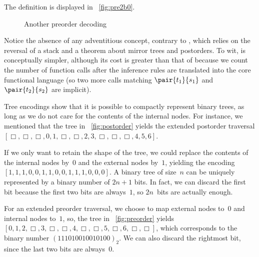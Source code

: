 The definition is displayed in
\fig~\vref{fig:pre2b0}.
\begin{figure}[b]
\abovedisplayskip=0pt
\belowdisplayskip=0pt
\centering
{}
\caption{Another preorder decoding}
\label{fig:pre2b0}
\end{figure}
Notice the absence of any adventitious concept, contrary to
, which relies on the
reversal of a stack and a theorem about mirror
trees and postorders. To wit,
 is conceptually
simpler, although its cost is greater than that of
 because we count the number
of function calls after the inference rules
are translated into the core functional language (so two more calls
matching \(\pair{t_1}{s_1}\) and \(\pair{t_2}{s_2}\) are implicit).

Tree encodings show that it is possible to compactly represent binary
trees, as long as we do not care for the contents of the internal
nodes. For instance, we mentioned that the tree in
\fig~\vref{fig:postorder} yields the extended postorder traversal \([\Box, \Box, \Box, 0, 1, \Box,
  \Box, 2, 3, \Box, \Box, \Box, 4, 5, 6]\).

If we only want to retain the shape of the tree, we could replace the
contents of the internal nodes by~\(0\) and the external nodes
by~\(1\), yielding the encoding \([1,1,1,0,0,1,1,0,0,1,1,1,0,0,0]\). A
binary tree of size~\(n\) can be uniquely represented by a binary
number of \(2n+1\) bits. In fact, we can discard the first bit because
the first two bits are always~\(1\), so \(2n\)~bits are actually
enough.

For an extended preorder traversal, we choose to map external nodes
to~\(0\) and internal nodes to~\(1\), so, the tree in
\fig~\vref{fig:preorder} yields \([0, 1, 2, \Box, 3, \Box, \Box, 4,
  \Box, \Box, 5, \Box, 6, \Box, \Box]\), which corresponds to the
binary number \((111010010010100)_2\). We can also discard the
rightmost bit, since the last two bits are always~\(0\).

